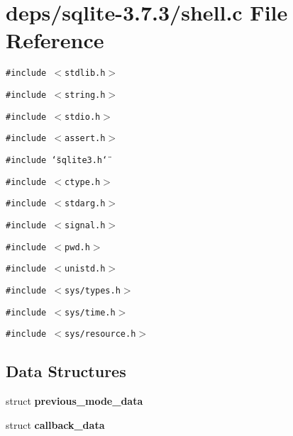 \section{deps/sqlite-3.7.3/shell.c File Reference}
\label{3_87_83_2shell_8c}
{\tt \#include $<$stdlib.h$>$}\par
{\tt \#include $<$string.h$>$}\par
{\tt \#include $<$stdio.h$>$}\par
{\tt \#include $<$assert.h$>$}\par
{\tt \#include \char`\"{}sqlite3.h\char`\"{}}\par
{\tt \#include $<$ctype.h$>$}\par
{\tt \#include $<$stdarg.h$>$}\par
{\tt \#include $<$signal.h$>$}\par
{\tt \#include $<$pwd.h$>$}\par
{\tt \#include $<$unistd.h$>$}\par
{\tt \#include $<$sys/types.h$>$}\par
{\tt \#include $<$sys/time.h$>$}\par
{\tt \#include $<$sys/resource.h$>$}\par
\subsection*{Data Structures}
\begin{CompactItemize}
\item 
struct \bf{previous\_\-mode\_\-data}
\item 
struct \bf{callback\_\-data}
\end{CompactItemize}
